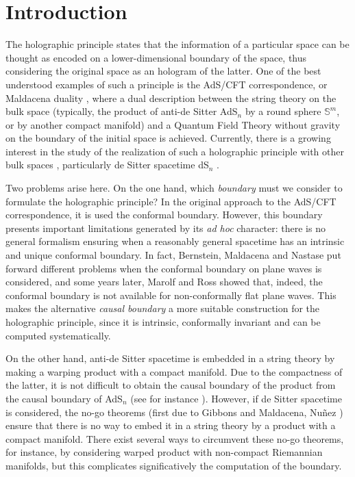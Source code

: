 \section{Introduction}

The holographic principle \cite{tHooft:1993dmi,doi:10.1063/1.531249} states that the information of a particular space can be thought as encoded on a lower-dimensional boundary of the space, thus considering the original space as an hologram of the latter. One of the best understood examples of such a principle is the AdS/CFT correspondence, or Maldacena duality \cite{Mal}, where a dual description between the string theory on the bulk space (typically, the product of anti-de Sitter AdS$_n$ by a round sphere $\mathbb{S}^m$, or by another compact manifold) and a Quantum Field Theory without gravity on the  boundary of the initial space is achieved. Currently, there is a growing interest in the study of the realization of such a holographic principle with other bulk spaces \cite{PhysRevD.80.124008,GHODSI201079,1126-6708-2009-04-019}, particularly de Sitter spacetime dS$_{n}$ \cite{Witten:2001kn,1126-6708-2001-10-034,0264-9381-34-1-015009,Gibbons:1984kp}.



Two problems arise here. On the one hand, which {\em boundary} must we consider to formulate the holographic principle? In the original approach to the AdS/CFT correspondence, it is used the conformal boundary. However, this boundary presents important limitations generated by its {\em ad hoc} character: there is  no general formalism ensuring when a reasonably general spacetime has an intrinsic and unique conformal boundary. In fact, Bernstein, Maldacena and Nastase \cite{BMN} put forward different problems when the conformal boundary on plane waves is considered, and some years later, Marolf and Ross \cite{MR1} showed that, indeed, the conformal boundary is not available for non-conformally flat plane waves. This makes the alternative {\em causal boundary} a more suitable construction for the holographic principle, since it is intrinsic, conformally invariant and can be computed systematically.

On the other hand, anti-de Sitter spacetime is embedded in a string theory by making a warping product with a compact manifold. Due to the compactness of the latter, it is not difficult to obtain the causal boundary of the product from the causal boundary of AdS$_n$ (see for instance \cite{AF}). However, if de Sitter spacetime is considered, the no-go theorems (first due to Gibbons \cite{Gibbons:1984kp} and Maldacena, Nuñez \cite{doi:10.1142/S0217751X01003937}) ensure that there is no way to embed it in a string theory by a product with a compact manifold. There exist several ways to circumvent these no-go theorems, for instance, by considering warped product with non-compact Riemannian manifolds, but this complicates significatively the computation of the boundary.

